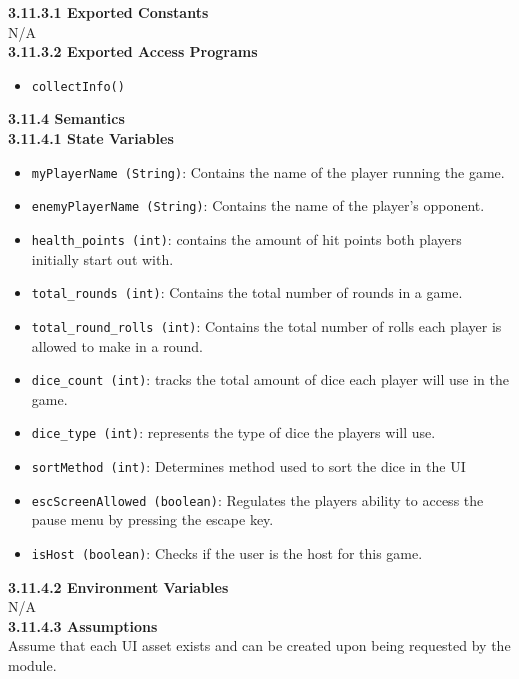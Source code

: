 \documentclass[12pt, titlepage]{article}
\begin{document}
\noindent \textbf{3.11.3.1 Exported Constants}\\
N/A\\

\textbf{3.11.3.2 Exported Access Programs}
\begin{itemize}
	\item \texttt{collectInfo()}
	
	
\end{itemize}

\noindent \textbf{3.11.4 Semantics}\\
\textbf{3.11.4.1 State Variables}\\
\begin{itemize}
	\item \texttt{myPlayerName (String)}: Contains the name of the player running the game.
	\item \texttt{enemyPlayerName (String)}: Contains the name of the player's opponent.
	\item \texttt{health\_points (int)}: contains the amount of hit points both players initially start out with.
	\item \texttt{total\_rounds (int)}: Contains the total number of rounds in a game.
	\item \texttt{total\_round\_rolls (int)}: Contains the total number of rolls each player is allowed to make in a round.
	\item \texttt{dice\_count (int)}: tracks the total amount of dice each player will use in the game.
	\item \texttt{dice\_type (int)}: represents the type of dice the players will use.
	\item \texttt{sortMethod (int)}: Determines method used to sort the dice in the UI
	\item \texttt{escScreenAllowed (boolean)}: Regulates the players ability to access the pause menu by pressing the escape key.
	\item \texttt{isHost (boolean)}: Checks if the user is the host for this game.


\end{itemize}

\textbf{3.11.4.2 Environment Variables}\\

N/A\\

\textbf{3.11.4.3 Assumptions}\\
Assume that each UI asset exists and can be created upon being requested by the module. 
\end{document}
